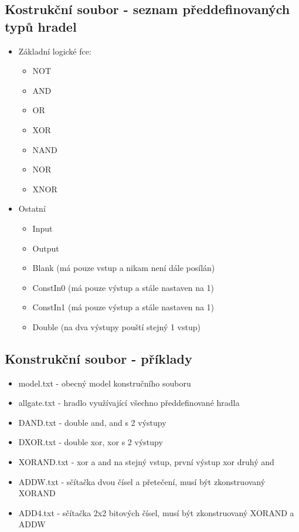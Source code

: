 \documentclass[12pt, oneside]{article}
\begin{document}
\subsection*{Kostrukční soubor - seznam předdefinovaných typů hradel}
\begin{itemize}
\item Základní logické fce: 
\begin{itemize}
\item NOT
\item AND
\item OR
\item XOR
\item NAND
\item NOR
\item XNOR
\end{itemize}
\item Ostatní 
\begin{itemize}
\item Input
\item Output
\item Blank (má pouze vstup a nikam není dále posílán) 
\item ConstIn0 (má pouze výstup a stále nastaven na 1)
\item ConstIn1 (má pouze výstup a stále nastaven na 1) 
\item Double (na dva výstupy pouští stejný 1 vstup) 
\end{itemize}
\end{itemize}
\subsection*{Konstrukční soubor - příklady} 
\begin{itemize}
\item model.txt - obecný model konstručního souboru
\item allgate.txt - hradlo využívající všechno předdefinované hradla
\item DAND.txt - double and, and s 2 výstupy
\item DXOR.txt - double xor, xor s 2 výstupy
\item XORAND.txt - xor a and na stejný vstup, první výstup xor druhý and
\item ADDW.txt - sčítačka dvou čísel a přetečení, musí být zkonstruovaný XORAND
\item ADD4.txt - sčítačka 2x2 bitových čísel, musí být zkonstruovaný XORAND a ADDW
\end{itemize}
\newpage
\end{document}

